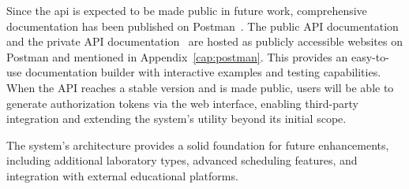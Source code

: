 Since the \acs{api} is expected to be made public in future work, comprehensive documentation has been published on Postman~\cite{postman}. The public API documentation~\cite{public-api-documentation} and the private API documentation~\cite{private-api-documentation} are hosted as publicly accessible websites on Postman and mentioned in Appendix~\ref{cap:postman}. This provides an easy-to-use documentation builder with interactive examples and testing capabilities. When the API reaches a stable version and is made public, users will be able to generate authorization tokens via the web interface, enabling third-party integration and extending the system's utility beyond its initial scope.

The system's architecture provides a solid foundation for future enhancements, including additional laboratory types, advanced scheduling features, and integration with external educational platforms.